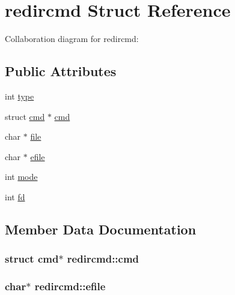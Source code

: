 \hypertarget{structredircmd}{}\section{redircmd Struct Reference}
\label{structredircmd}


Collaboration diagram for redircmd\+:
\subsection*{Public Attributes}
\begin{DoxyCompactItemize}
\item 
int \hyperlink{structredircmd_ac3e4a2de55ca2175ede05a3f49bbb835}{type}
\item 
struct \hyperlink{structcmd}{cmd} $\ast$ \hyperlink{structredircmd_ad0e2824b83cc8a1da99b2922025011dc}{cmd}
\item 
char $\ast$ \hyperlink{structredircmd_adfbfcf9111724e5b453bab2ed3ee308f}{file}
\item 
char $\ast$ \hyperlink{structredircmd_a7bd00698c6fbc539415332f187d78317}{efile}
\item 
int \hyperlink{structredircmd_a36b522983b6a0c0efdaea471b08d120b}{mode}
\item 
int \hyperlink{structredircmd_a1d4b8ba36b5bb4e9e4af58a6d58934a1}{fd}
\end{DoxyCompactItemize}


\subsection{Member Data Documentation}
\subsubsection[{\texorpdfstring{cmd}{cmd}}]{\setlength{\rightskip}{0pt plus 5cm}struct {\bf cmd}$\ast$ redircmd\+::cmd}\hypertarget{structredircmd_ad0e2824b83cc8a1da99b2922025011dc}{}\label{structredircmd_ad0e2824b83cc8a1da99b2922025011dc}
\subsubsection[{\texorpdfstring{efile}{efile}}]{\setlength{\rightskip}{0pt plus 5cm}char$\ast$ redircmd\+::efile}\hypertarget{structredircmd_a7bd00698c6fbc539415332f187d78317}{}\label{structredircmd_a7bd00698c6fbc539415332f187d78317}
